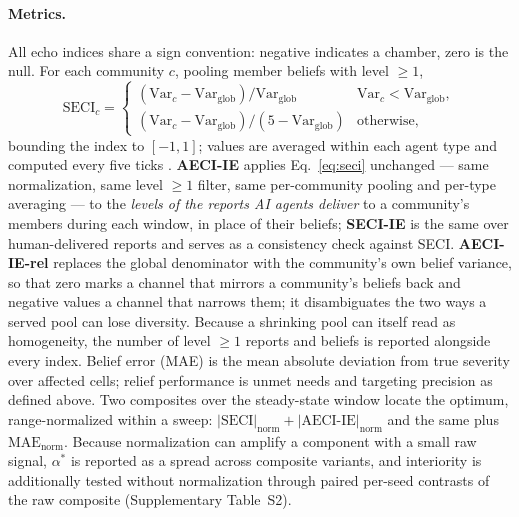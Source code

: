 \documentclass[pdflatex,sn-nature]{sn-jnl}
\begin{document}
\paragraph{Metrics.} All echo indices share a sign convention: negative indicates a chamber, zero is the null. For each community $c$, pooling member beliefs with level $\geq 1$,
\begin{equation}
\text{SECI}_c =
\begin{cases}
(\text{Var}_c - \text{Var}_{\text{glob}})/\text{Var}_{\text{glob}} & \text{Var}_c < \text{Var}_{\text{glob}}, \\[1ex]
(\text{Var}_c - \text{Var}_{\text{glob}})/(5 - \text{Var}_{\text{glob}}) & \text{otherwise},
\end{cases}
\label{eq:seci}
\end{equation}
bounding the index to $[-1, 1]$; values are averaged within each agent type and computed every five ticks \citep{cinelli2021echo}. \textbf{AECI-IE} applies Eq.~\ref{eq:seci} unchanged --- same normalization, same level $\geq 1$ filter, same per-community pooling and per-type averaging --- to the \emph{levels of the reports AI agents deliver} to a community's members during each window, in place of their beliefs; \textbf{SECI-IE} is the same over human-delivered reports and serves as a consistency check against SECI. \textbf{AECI-IE-rel} replaces the global denominator with the community's own belief variance, so that zero marks a channel that mirrors a community's beliefs back and negative values a channel that narrows them; it disambiguates the two ways a served pool can lose diversity. Because a shrinking pool can itself read as homogeneity, the number of level $\geq 1$ reports and beliefs is reported alongside every index. Belief error (MAE) is the mean absolute deviation from true severity over affected cells; relief performance is unmet needs and targeting precision as defined above. Two composites over the steady-state window locate the optimum, range-normalized within a sweep: $|\text{SECI}|_{\text{norm}} + |\text{AECI-IE}|_{\text{norm}}$ and the same plus $\text{MAE}_{\text{norm}}$. Because normalization can amplify a component with a small raw signal, $\alpha^{*}$ is reported as a spread across composite variants, and interiority is additionally tested without normalization through paired per-seed contrasts of the raw composite (Supplementary Table~S2).
\end{document}
